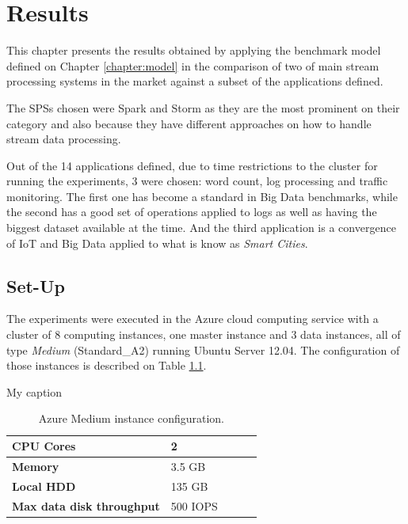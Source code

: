 \documentclass[ppgc,diss,english]{iiufrgs}
\begin{document}
\chapter{Results}
\label{chapter:results}

This chapter presents the results obtained by applying the benchmark model defined on Chapter \ref{chapter:model} in the comparison of two of main stream processing systems in the market against a subset of the applications defined.

The SPSs chosen were Spark and Storm as they are the most prominent on their category and also because they have different approaches on how to handle stream data processing.

Out of the 14 applications defined, due to time restrictions to the cluster for running the experiments, 3 were chosen: word count, log processing and traffic monitoring. The first one has become a standard in Big Data benchmarks, while the second has a good set of operations applied to logs as well as having the biggest dataset available at the time. And the third application is a convergence of IoT and Big Data applied to what is know as \textit{Smart Cities}.

\section{Set-Up}
\label{sec:set-up}

The experiments were executed in the Azure cloud computing service with a cluster of 8 computing instances, one master instance and 3 data instances, all of type \textit{Medium} (Standard\_A2) running Ubuntu Server 12.04. The configuration of those instances is described on Table \ref{table:azure_medium_config}.

\begin{table}[h]
\centering
\caption{My caption}
\label{my-label}
\begin{tabular}{lllll}
\hline
\textbf{CPU Cores}                & 2        &  &  &  \\ \hline
\textbf{Memory}                   & 3.5 GB   &  &  &  \\ \hline
\textbf{Local HDD}                & 135 GB   &  &  &  \\ \hline
\textbf{Max data disk throughput} & 500 IOPS &  &  &  \\ \hline
\end{tabular}
\caption{Azure Medium instance configuration.}
	\label{table:azure_medium_config}
\end{table}
\end{document}
